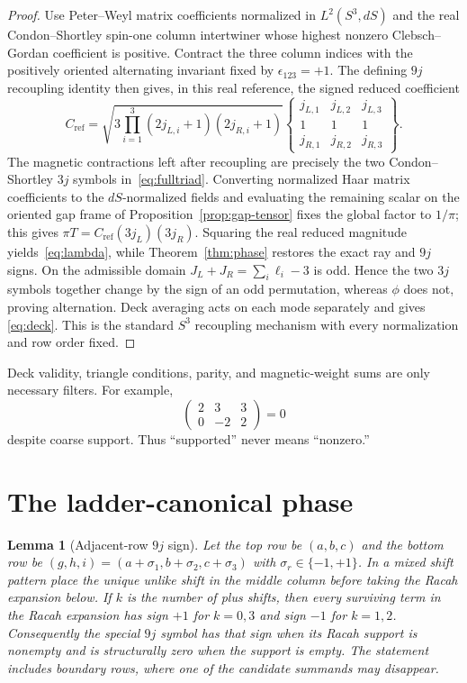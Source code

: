 \documentclass[12pt]{article}
\newtheorem{lemma}[theorem]{Lemma}
\theoremstyle{definition}
\theoremstyle{remark}
\begin{document}
\begin{proof}
Use Peter--Weyl matrix coefficients normalized in
$L^2(S^3,dS)$ and the real Condon--Shortley spin-one column intertwiner whose
highest nonzero Clebsch--Gordan coefficient is positive.  Contract the three
column indices with the positively oriented alternating invariant fixed by
$\epsilon_{123}=+1$.  The defining $9j$ recoupling identity then gives, in
this real reference, the signed reduced coefficient
\[
 C_{\mathrm{ref}}=
 \sqrt{3\prod_{i=1}^3(2j_{L,i}+1)(2j_{R,i}+1)}
 \begin{Bmatrix}
  j_{L,1}&j_{L,2}&j_{L,3}\\
  1&1&1\\
  j_{R,1}&j_{R,2}&j_{R,3}
 \end{Bmatrix}.
\]
The magnetic contractions left after recoupling are precisely the two
Condon--Shortley $3j$ symbols in~\eqref{eq:fulltriad}.  Converting normalized
Haar matrix coefficients to the $dS$-normalized fields and evaluating the
remaining scalar on the oriented gap frame of
Proposition~\ref{prop:gap-tensor} fixes the global factor to $1/\pi$; this
gives $\pi T=C_{\mathrm{ref}}(3j_L)(3j_R)$.  Squaring the real reduced
magnitude yields~\eqref{eq:lambda}, while Theorem~\ref{thm:phase} restores
the exact ray and $9j$ signs.  On the admissible domain
$J_L+J_R=\sum_i\ell_i-3$ is odd.  Hence the two $3j$ symbols together change
by the sign of an odd permutation, whereas $\phi$ does not, proving
alternation.  Deck averaging acts on each mode separately and gives
\eqref{eq:deck}.  This is the standard $S^3$ recoupling mechanism
\cite{HamadaHorata2003,BaigueraEtAl2021} with every normalization and row
order fixed.
\end{proof}

Deck validity, triangle conditions, parity, and magnetic-weight sums are only
necessary filters.  For example,
\[
 \begin{pmatrix}2&3&3\\0&-2&2\end{pmatrix}=0
\]
despite coarse support.  Thus ``supported'' never means ``nonzero.''

\section{The ladder-canonical phase}\label{sec:phase}

\begin{lemma}[Adjacent-row $9j$ sign]\label{lem:9j-sign}
Let the top row be $(a,b,c)$ and the bottom row be
$(g,h,i)=(a+\sigma_1,b+\sigma_2,c+\sigma_3)$ with
$\sigma_r\in\{-1,+1\}$.  In a mixed shift pattern place the unique unlike
shift in the middle column before taking the Racah expansion below.
If $k$ is the number of plus shifts, then every
surviving term in the Racah expansion has sign $+1$ for $k=0,3$ and sign
$-1$ for $k=1,2$.  Consequently the special $9j$ symbol has that sign when
its Racah support is nonempty and is structurally zero when the support is
empty.  The statement includes boundary rows, where one of the candidate
summands may disappear.
\end{lemma}
\end{document}

